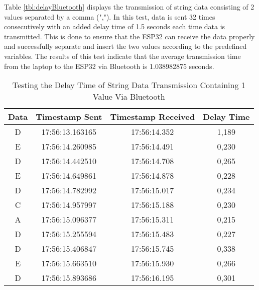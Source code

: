 Table \ref{tbl:delayBluetooth} displays the transmission of string data consisting of 2 values separated by a comma (","). In this test, data is sent 32 times consecutively with an added delay time of 1.5 seconds each time data is transmitted. This is done to ensure that the ESP32 can receive the data properly and successfully separate and insert the two values according to the predefined variables. The results of this test indicate that the average transmission time from the laptop to the ESP32 via Bluetooth is 1.038982875 seconds.

\begin{table}[!h]
\centering
  \caption{Testing the Delay Time of String Data Transmission Containing 1 Value Via Bluetooth}
  \label{tbl:delayBluetooth1}
  \begin{tabular}{|ccc|c|}
  \hline
  \multicolumn{1}{|c|}{Data} & \multicolumn{1}{c|}{Timestamp Sent}  & Timestamp Received & Delay Time   \\ \hline
  \multicolumn{1}{|c|}{D}    & \multicolumn{1}{c|}{17:56:13.163165} & 17:56:14.352       & 1,189        \\ \hline
  \multicolumn{1}{|c|}{E}    & \multicolumn{1}{c|}{17:56:14.260985} & 17:56:14.491       & 0,230        \\ \hline
  \multicolumn{1}{|c|}{D}    & \multicolumn{1}{c|}{17:56:14.442510} & 17:56:14.708       & 0,265        \\ \hline
  \multicolumn{1}{|c|}{E}    & \multicolumn{1}{c|}{17:56:14.649861} & 17:56:14.878       & 0,228        \\ \hline
  \multicolumn{1}{|c|}{D}    & \multicolumn{1}{c|}{17:56:14.782992} & 17:56:15.017       & 0,234        \\ \hline
  \multicolumn{1}{|c|}{C}    & \multicolumn{1}{c|}{17:56:14.957997} & 17:56:15.188       & 0,230        \\ \hline
  \multicolumn{1}{|c|}{A}    & \multicolumn{1}{c|}{17:56:15.096377} & 17:56:15.311       & 0,215        \\ \hline
  \multicolumn{1}{|c|}{D}    & \multicolumn{1}{c|}{17:56:15.255594} & 17:56:15.483       & 0,227        \\ \hline
  \multicolumn{1}{|c|}{D}    & \multicolumn{1}{c|}{17:56:15.406847} & 17:56:15.745       & 0,338        \\ \hline
  \multicolumn{1}{|c|}{E}    & \multicolumn{1}{c|}{17:56:15.663510} & 17:56:15.930       & 0,266        \\ \hline
  \multicolumn{1}{|c|}{D}    & \multicolumn{1}{c|}{17:56:15.893686} & 17:56:16.195       & 0,301        \\ \hline

\end{tabular}
\end{table}
